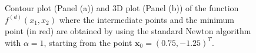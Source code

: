 \documentclass[a4paper,11pt]{article}
\begin{document}
	\begin{figure}[H]
		\centering
		 \quad
		\caption{Contour plot (Panel (a)) and 3D plot (Panel (b)) of the function $f^{(d)}(x_{1},x_{2})$ where the intermediate points and the minimum point (in red) are obtained by using the standard Newton algorithm with $\alpha=1$, starting from the point $\textbf{x}_{0}=(0.75,-1.25)^{T}$.}
		\label{Fig:func_d_x0_1}
	\end{figure}
\end{document}
